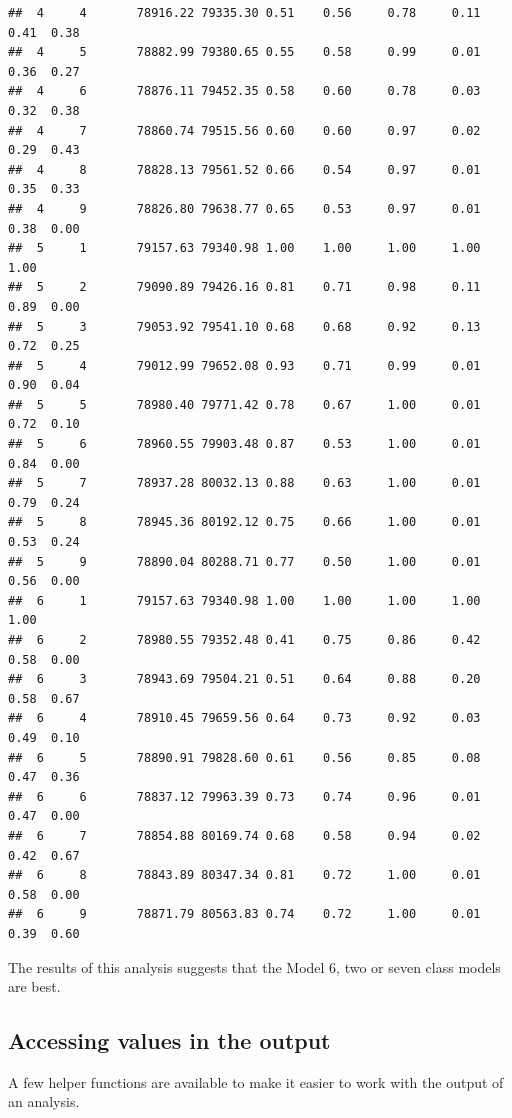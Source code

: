 \documentclass[
  english,
  man]{apa6}
\begin{document}
\begin{verbatim}
##  4     4       78916.22 79335.30 0.51    0.56     0.78     0.11  0.41  0.38  
##  4     5       78882.99 79380.65 0.55    0.58     0.99     0.01  0.36  0.27  
##  4     6       78876.11 79452.35 0.58    0.60     0.78     0.03  0.32  0.38  
##  4     7       78860.74 79515.56 0.60    0.60     0.97     0.02  0.29  0.43  
##  4     8       78828.13 79561.52 0.66    0.54     0.97     0.01  0.35  0.33  
##  4     9       78826.80 79638.77 0.65    0.53     0.97     0.01  0.38  0.00  
##  5     1       79157.63 79340.98 1.00    1.00     1.00     1.00  1.00        
##  5     2       79090.89 79426.16 0.81    0.71     0.98     0.11  0.89  0.00  
##  5     3       79053.92 79541.10 0.68    0.68     0.92     0.13  0.72  0.25  
##  5     4       79012.99 79652.08 0.93    0.71     0.99     0.01  0.90  0.04  
##  5     5       78980.40 79771.42 0.78    0.67     1.00     0.01  0.72  0.10  
##  5     6       78960.55 79903.48 0.87    0.53     1.00     0.01  0.84  0.00  
##  5     7       78937.28 80032.13 0.88    0.63     1.00     0.01  0.79  0.24  
##  5     8       78945.36 80192.12 0.75    0.66     1.00     0.01  0.53  0.24  
##  5     9       78890.04 80288.71 0.77    0.50     1.00     0.01  0.56  0.00  
##  6     1       79157.63 79340.98 1.00    1.00     1.00     1.00  1.00        
##  6     2       78980.55 79352.48 0.41    0.75     0.86     0.42  0.58  0.00  
##  6     3       78943.69 79504.21 0.51    0.64     0.88     0.20  0.58  0.67  
##  6     4       78910.45 79659.56 0.64    0.73     0.92     0.03  0.49  0.10  
##  6     5       78890.91 79828.60 0.61    0.56     0.85     0.08  0.47  0.36  
##  6     6       78837.12 79963.39 0.73    0.74     0.96     0.01  0.47  0.00  
##  6     7       78854.88 80169.74 0.68    0.58     0.94     0.02  0.42  0.67  
##  6     8       78843.89 80347.34 0.81    0.72     1.00     0.01  0.58  0.00  
##  6     9       78871.79 80563.83 0.74    0.72     1.00     0.01  0.39  0.60
\end{verbatim}

The results of this analysis suggests that the Model 6, two or seven class models are best.

\hypertarget{accessing-values-in-the-output}{%
\subsection{Accessing values in the output}\label{accessing-values-in-the-output}}

A few helper functions are available to make it easier to work with the output
of an analysis.
\end{document}
